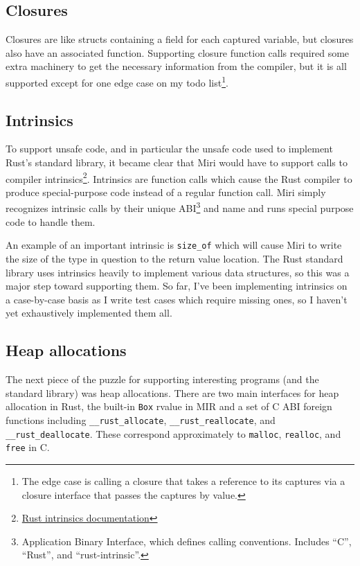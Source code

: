 \documentclass[twocolumn]{article}
\newcommand{\rust}[1]{\texttt{#1}}
\begin{document}
\subsection{Closures}

Closures are like structs containing a field for each captured variable, but closures also have an
associated function. Supporting closure function calls required some extra machinery to get the
necessary information from the compiler, but it is all supported except for one edge case on my todo
list\footnote{The edge case is calling a closure that takes a reference to its captures via a
closure interface that passes the captures by value.}.

\subsection{Intrinsics}

To support unsafe code, and in particular the unsafe code used to implement Rust's standard library,
it became clear that Miri would have to support calls to compiler
intrinsics\footnote{\href{https://doc.rust-lang.org/stable/std/intrinsics/index.html}{Rust
intrinsics documentation}}. Intrinsics are function calls which cause the Rust compiler to produce
special-purpose code instead of a regular function call. Miri simply recognizes intrinsic calls by
their unique ABI\footnote{Application Binary Interface, which defines calling conventions. Includes
``C'', ``Rust'', and ``rust-intrinsic''.} and name and runs special purpose code to handle them.

An example of an important intrinsic is \rust{size_of} which will cause Miri to write the size of
the type in question to the return value location. The Rust standard library uses intrinsics heavily
to implement various data structures, so this was a major step toward supporting them. So far, I've
been implementing intrinsics on a case-by-case basis as I write test cases which require missing
ones, so I haven't yet exhaustively implemented them all.

\subsection{Heap allocations}

The next piece of the puzzle for supporting interesting programs (and the standard library) was heap
allocations. There are two main interfaces for heap allocation in Rust, the built-in \rust{Box}
rvalue in MIR and a set of C ABI foreign functions including \rust{__rust_allocate},
\rust{__rust_reallocate}, and \rust{__rust_deallocate}. These correspond approximately to
\texttt{malloc}, \texttt{realloc}, and \texttt{free} in C.
\end{document}

